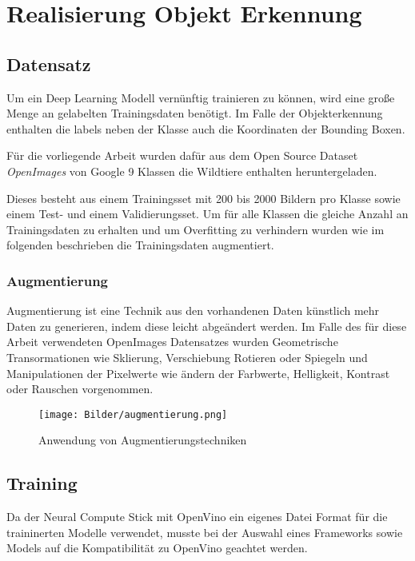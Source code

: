 \chapter{Realisierung Objekt Erkennung}\label{kap:objerk}

\section{Datensatz}\label{sec:dataset}

Um ein Deep Learning Modell vernünftig trainieren zu können, 
wird eine große Menge an gelabelten Trainingsdaten benötigt.
Im Falle der Objekterkennung enthalten die labels neben der 
Klasse auch die Koordinaten der Bounding Boxen.


Für die vorliegende Arbeit wurden dafür aus dem Open Source 
Dataset \textit{OpenImages} \cite{kuznetsovaOpenImagesDataset2018} 
von Google 9 Klassen die Wildtiere enthalten heruntergeladen.

Dieses besteht aus einem Trainingsset mit 200 bis 2000 Bildern pro 
Klasse sowie einem Test- und einem Validierungsset. Um für alle Klassen 
die gleiche Anzahl an Trainingsdaten zu erhalten und um Overfitting zu 
verhindern wurden wie im folgenden beschrieben die Trainingsdaten 
augmentiert.

\subsection{Augmentierung}

Augmentierung ist eine Technik aus den vorhandenen Daten 
künstlich mehr Daten zu generieren, indem diese leicht 
abgeändert werden. Im Falle des für diese Arbeit verwendeten
OpenImages Datensatzes wurden Geometrische Transormationen 
wie Sklierung, Verschiebung Rotieren oder Spiegeln und 
Manipulationen der Pixelwerte wie ändern der 
Farbwerte, Helligkeit, Kontrast oder Rauschen vorgenommen.

\begin{figure}[htb]
    \centering
    \label{fig:augmentierung}
    \texttt{[image: Bilder/augmentierung.png]}
    \caption{Anwendung von Augmentierungstechniken}
\end{figure}


\section{Training}

Da der Neural Compute Stick mit OpenVino ein eigenes Datei Format 
für die traininerten Modelle verwendet, musste bei der Auswahl
eines Frameworks sowie Models auf die Kompatibilität zu OpenVino 
geachtet werden. 

